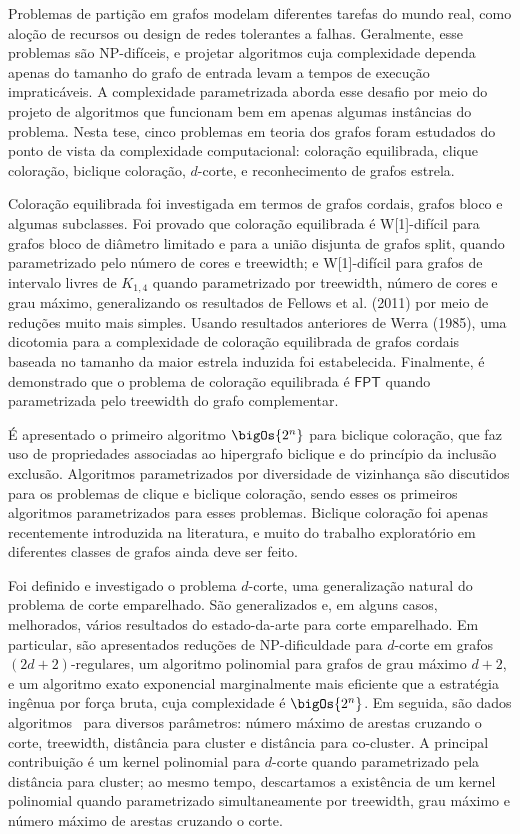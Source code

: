 Problemas de partição em grafos modelam diferentes tarefas do mundo real, como aloção de recursos ou design de redes tolerantes a falhas.
Geralmente, esse problemas são NP-difíceis, e projetar algoritmos cuja complexidade dependa apenas do tamanho do grafo de entrada levam a tempos de execução impraticáveis.
A complexidade parametrizada aborda esse desafio por meio do projeto de algoritmos que funcionam bem em apenas algumas instâncias do problema.
Nesta tese, cinco problemas em teoria dos grafos foram estudados do ponto de vista da complexidade computacional: coloração equilibrada, clique coloração, biclique coloração, $d$-corte, e reconhecimento de grafos estrela.

Coloração equilibrada foi investigada em termos de grafos cordais, grafos bloco e algumas subclasses.
Foi provado que coloração equilibrada  é
\textsf{W[1]-difícil} para grafos bloco de diâmetro limitado e para a união disjunta de grafos split, quando parametrizado pelo número de cores e treewidth; e
\textsf{W[1]-difícil} para grafos de intervalo livres de $K_{1,4}$ quando parametrizado por treewidth, número de cores e grau máximo, generalizando os resultados de Fellows et al. (2011) por meio de reduções muito mais simples.
Usando resultados anteriores de Werra (1985), uma dicotomia para a complexidade de coloração equilibrada de grafos cordais baseada no tamanho da maior estrela induzida foi estabelecida.
Finalmente, é demonstrado que o problema de coloração equilibrada é $\mathsf{FPT}$ quando parametrizada pelo treewidth do grafo complementar.

É apresentado o primeiro algoritmo $\bigOs{2^n}$ para biclique coloração, que faz uso de propriedades associadas ao hipergrafo biclique e do princípio da inclusão exclusão.
Algoritmos parametrizados por diversidade de vizinhança são discutidos para os problemas de clique e biclique coloração, sendo esses os primeiros algoritmos parametrizados para esses problemas.
Biclique coloração foi apenas recentemente introduzida na literatura, e muito do trabalho exploratório em diferentes classes de grafos ainda deve ser feito.

Foi definido e investigado o problema $d$-corte, uma generalização natural do problema de corte emparelhado.
São generalizados e, em alguns casos, melhorados, vários resultados do estado-da-arte para corte emparelhado.
Em particular, são apresentados reduções de \textsf{NP-dificuldade} para $d$-corte em grafos $(2d+2)$-regulares, um algoritmo polinomial para grafos de grau máximo $d + 2$, e um algoritmo exato exponencial marginalmente mais eficiente que a estratégia ingênua por força bruta, cuja complexidade é $\bigOs{2^n}$.
Em seguida, são dados algoritmos \FPT\ para diversos parâmetros: número máximo de arestas cruzando o corte, treewidth, distância para cluster e distância para co-cluster.
A principal contribuição é um kernel polinomial para $d$-corte quando parametrizado pela distância para cluster; ao mesmo tempo, descartamos a existência de um kernel polinomial quando parametrizado simultaneamente por treewidth, grau máximo e número máximo de arestas cruzando o corte.

